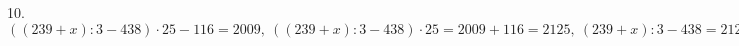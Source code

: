 10. $((239+x):3-438)\cdot25-116=2009,\ ((239+x):3-438)\cdot25=2009+116=2125,\ (239+x):3-438=2125:25=85,\ (239+x):3=438+85=523,\ 239+x=523\cdot3=1569,\ x=1569-239=1330.$\\
